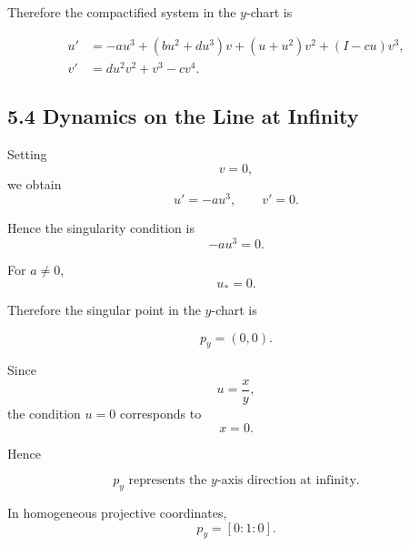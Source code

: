 \documentclass[11pt,a4paper]{article}
\begin{document}
Therefore the compactified system in the $y$-chart is

\begin{equation}
\boxed{
\begin{aligned}
u'
&=
-au^3+(bu^2+du^3)v
+(u+u^2)v^2
+(I-cu)v^3,
\\[1mm]
v'
&=
du^2v^2+v^3-cv^4.
\end{aligned}}
\tag{36}
\end{equation}

\subsection{5.4 Dynamics on the Line at Infinity}

Setting
\begin{equation}
v=0,
\end{equation}
we obtain
\begin{equation}
\boxed{
u'=-au^3,
\qquad
v'=0.
}
\tag{37}
\end{equation}

Hence the singularity condition is
\begin{equation}
-au^3=0.
\end{equation}

For $a\neq0$,
\begin{equation}
\boxed{
u_*=0.
}
\tag{38}
\end{equation}

Therefore the singular point in the $y$-chart is

\begin{equation}
\boxed{
p_y=(0,0).
}
\tag{39}
\end{equation}

Since
\begin{equation}
u=\frac{x}{y},
\end{equation}
the condition $u=0$ corresponds to
\begin{equation}
x=0.
\end{equation}

Hence

\begin{equation}
\boxed{
p_y\text{ represents the $y$-axis direction at infinity}.
}
\tag{40}
\end{equation}

In homogeneous projective coordinates,
\begin{equation}
\boxed{
p_y=[0:1:0].
}
\tag{41}
\end{equation}
\end{document}
